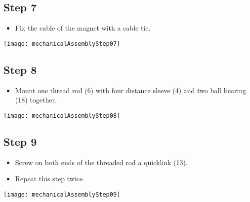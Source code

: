 \subsection*{Step 7}

\begin{minipage}[t]{0.6\textwidth}
	\begin{itemize}
		\item Fix the cable of the magnet with a cable tie.
	\end{itemize}
\end{minipage}
\hfill
\begin{minipage}[t]{0.35\textwidth}
	\vspace{-\ht\strutbox}\texttt{[image: mechanicalAssemblyStep07]}
	\label{fig:MechanicalAssebmlyStep07} 
\end{minipage}

\subsection*{Step 8}

\begin{minipage}[t]{0.6\textwidth}
	\begin{itemize}
		\item Mount one thread rod (6) with four distance sleeve (4) and two ball bearing (18) together.
	\end{itemize}
\end{minipage}
\hfill
\begin{minipage}[t]{0.35\textwidth}
	\vspace{-\ht\strutbox}\texttt{[image: mechanicalAssemblyStep08]}
	\label{fig:MechanicalAssebmlyStep08} 
\end{minipage}

\subsection*{Step 9}

\begin{minipage}[t]{0.6\textwidth}
	\begin{itemize}
		\item Screw on both ends of the threaded rod a quicklink (13).
		\item Repeat this step twice.
	\end{itemize}
\end{minipage}
\hfill
\begin{minipage}[t]{0.35\textwidth}
	\vspace{-\ht\strutbox}\texttt{[image: mechanicalAssemblyStep09]}
	\label{fig:MechanicalAssebmlyStep09} 
\end{minipage}

